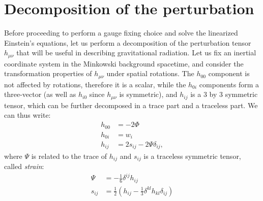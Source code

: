 \documentclass[a4paper]{article}
\begin{document}
\section{Decomposition of the perturbation}
Before proceeding to perform a gauge fixing choice and solve the linearized Einstein's equations, let us perform a decomposition of the perturbation tensor $h_{\mu\nu}$ that will be useful in describing gravitational radiation.
Let us fix an inertial coordinate system in the Minkowski background spacetime, and consider the transformation properties of $h_{\mu\nu}$ under spatial rotations. The $h_{00}$ component is not affected by rotations, therefore it is a scalar, while the $h_{0i}$ components form a three-vector (as well as $h_{i0}$ since $h_{\mu\nu}$ is symmetric), and $h_{ij}$ is a 3 by 3 symmetric tensor, which can be further decomposed in a trace part and a traceless part. We can thus write:
\begin{subequations}\label{eq:h-decomposition}
  \begin{align}
    h_{00} &= -2 \Phi \label{eq:h00-scalar}\\
    h_{0i} &= w_i \label{eq:h0i-vector}\\
    h_{ij} &= 2s_{ij} - 2 \Psi \delta_{ij}, \label{eq:hij-tensor}
  \end{align}
\end{subequations}
where $\Psi$ is related to the trace of $h_{ij}$ and $s_{ij}$ is a traceless symmetric tensor, called \textit{strain}:
\begin{align}
  \Psi &= -\frac{1}{6}\delta^{ij}h_{ij} \label{eq:psi}\\
  s_{ij} &= \frac{1}{2}\left(h_{ij} - \frac{1}{3}\delta^{kl}h_{kl}\delta_{ij}\right)
\end{align}
\end{document}
